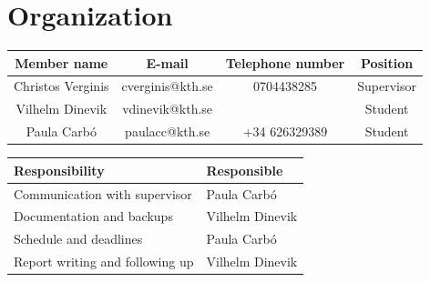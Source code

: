 \documentclass{article}
\begin{document}
	\section{Organization}
	\begin{center}
		\begin{tabular}{|c|c|c|c|}
			Member name & E-mail & Telephone number & Position \\ \hline
			Christos Verginis & cverginis@kth.se & 0704438285 & Supervisor \\ \hline
			Vilhelm Dinevik & vdinevik@kth.se & & Student\\ \hline
			Paula Carbó & paulacc@kth.se & +34 626329389 & Student\\ \hline
		\end{tabular}
		
		\bigskip
		
		\begin{tabular}{|C{6cm}|C{4cm}|}
			Responsibility & Responsible \\ \hline
			Communication with supervisor & Paula Carbó \\ \hline
			Documentation and backups & Vilhelm Dinevik \\ \hline
			Schedule and deadlines & Paula Carbó \\ \hline
			Report writing and following up & Vilhelm Dinevik \\ \hline
		\end{tabular}
		
	\end{center}
\end{document}
